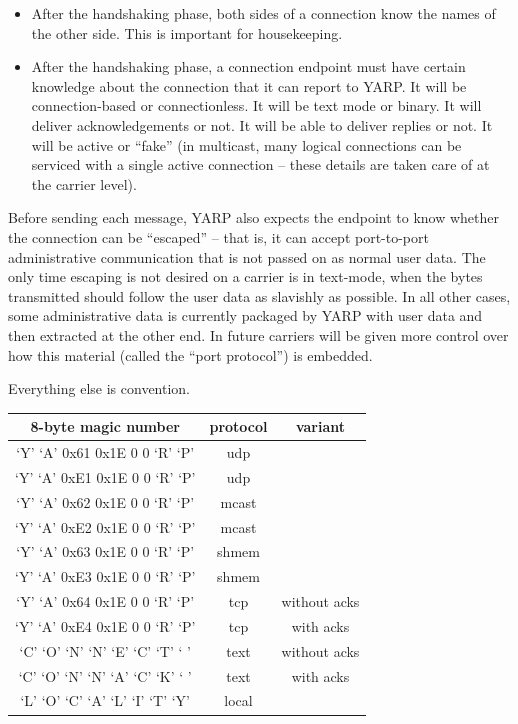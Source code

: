 \begin{itemize}

\item After the handshaking phase, both sides of a connection know the
names of the other side.  This is important for housekeeping.

\item After the handshaking phase, a connection endpoint must have
certain knowledge about the connection that it can report to YARP.  It
will be connection-based or connectionless.  It will be text mode or
binary.  It will deliver acknowledgements or not.  It will be able to
deliver replies or not.  It will be active or ``fake'' (in multicast,
many logical connections can be serviced with a single active
connection -- these details are taken care of at the carrier level).

\end{itemize}

Before sending each message, YARP also expects the endpoint to know
whether the connection can be ``escaped'' -- that is, it can accept
port-to-port administrative communication that is not passed on as
normal user data.  The only time escaping is not desired on a carrier
is in text-mode, when the bytes transmitted should follow the user
data as slavishly as possible.  In all other cases, some
administrative data is currently packaged by YARP with user data and
then extracted at the other end.  In future carriers will be given
more control over how this material (called the ``port protocol'') is
embedded.

Everything else is convention.

\begin{tabular}{c|c|c}
\hline
8-byte magic number&protocol&variant \\\hline
`Y' `A' 0x61 0x1E 0 0 `R' `P'&udp&\\\hline
`Y' `A' 0x\-E1 0x1E 0 0 `R' `P'&udp&\\\hline
`Y' `A' 0x62 0x1E 0 0 `R' `P'&mcast&\\\hline
`Y' `A' 0x\-E2 0x1E 0 0 `R' `P'&mcast&\\\hline
`Y' `A' 0x63 0x1E 0 0 `R' `P'&shmem&\\\hline
`Y' `A' 0x\-E3 0x1E 0 0 `R' `P'&shmem&\\\hline
`Y' `A' 0x64 0x1E 0 0 `R' `P'&tcp&without acks \\\hline
`Y' `A' 0x\-E4 0x1E 0 0 `R' `P'&tcp&with acks \\\hline
`C' `O' `N' `N' `E' `C' `T' ` ' &text&without acks \\\hline
`C' `O' `N' `N' `A' `C' `K' ` ' &text&with acks \\\hline
`L' `O' `C' `A' `L' `I' `T' `Y'&local&\\\hline
\end{tabular}



